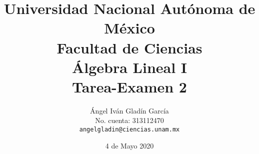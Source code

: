 \documentclass[letterpaper]{article}
\begin{document}
\title{
        Universidad Nacional Autónoma de México\\
        Facultad de Ciencias\\
        Álgebra Lineal I\\
    \vspace{.5cm}
    \large
        \textbf{Tarea-Examen 2}
}
\author{
    Ángel Iván Gladín García\\
    No. cuenta: 313112470\\
    \texttt{angelgladin@ciencias.unam.mx}
}
\date{4 de Mayo 2020}
\maketitle

\newtheorem{theorem}{Teorema}
\newtheorem*{theorem*}{Teorema}
\newtheorem{example}{Ejemplo}
\newtheorem{corollary}{Corolario}
\newtheorem*{corollary*}{Corolario}
\newtheorem{lemma}{Lemma}
\newtheorem{definition}{Definicion}
\newtheorem*{definition*}{Definición}
\newtheorem{prop}{Proposicion}
\end{document}
